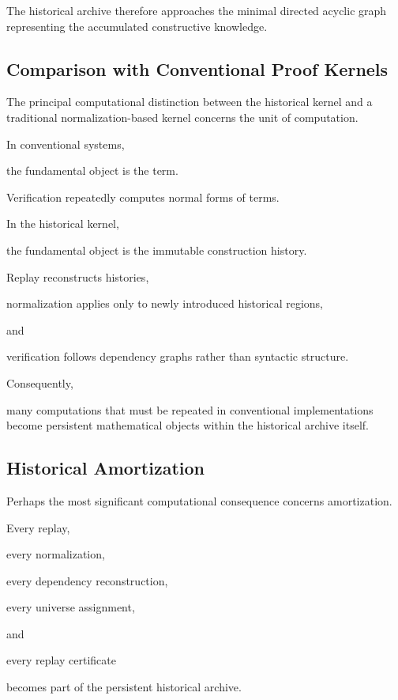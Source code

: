 \documentclass[12pt,oneside]{article}
\theoremstyle{definition}
\theoremstyle{remark}
\begin{document}
The historical archive therefore approaches the minimal directed acyclic graph
representing the accumulated constructive knowledge.


\subsection{Comparison with Conventional Proof Kernels}

The principal computational distinction between the historical kernel and a
traditional normalization-based kernel concerns the unit of computation.

In conventional systems,

the fundamental object is the term.

Verification repeatedly computes normal forms of terms.

In the historical kernel,

the fundamental object is the immutable construction history.

Replay reconstructs histories,

normalization applies only to newly introduced historical regions,

and

verification follows dependency graphs rather than syntactic structure.

Consequently,

many computations that must be repeated in conventional implementations become
persistent mathematical objects within the historical archive itself.


\subsection{Historical Amortization}

Perhaps the most significant computational consequence concerns amortization.

Every replay,

every normalization,

every dependency reconstruction,

every universe assignment,

and

every replay certificate

becomes part of the persistent historical archive.
\end{document}
